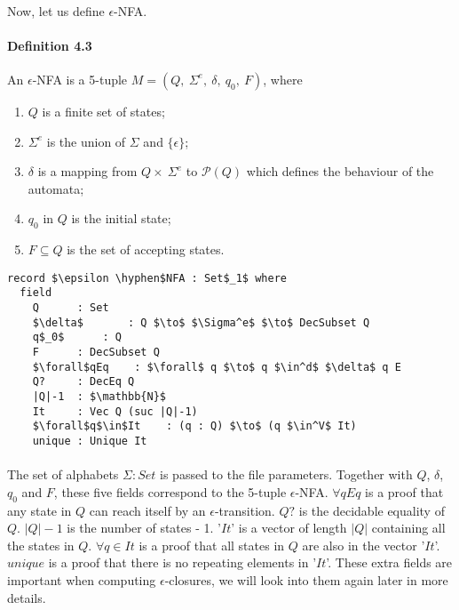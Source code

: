 \paragraph{} Now, let us define \(\epsilon\)-NFA. 

\paragraph{Definition 4.3} An \(\epsilon\)-NFA is a 5-tuple \(M = (Q
,\ \Sigma^e,\ \delta,\ q_0,\ F)\), where
\begin{enumerate}[nolistsep]
  \item \(Q\) is a finite set of states;
  \item \(\Sigma^e\) is the union of \(\Sigma\) and \(\{\epsilon\}\);
  \item \(\delta\) is a mapping from \(Q \times\ \Sigma^e\) to
    \(\mathcal P \left({Q}\right)\) which defines the behaviour of the automata;
  \item \(q_0\) in \(Q\) is the initial state;
  \item \(F \subseteq Q\) is the set of accepting states. 
\end{enumerate}
\vspace{0.7pc}
\begin{lstlisting}[caption=\(\epsilon\)-NFA,mathescape=true]
record $\epsilon \hyphen$NFA : Set$_1$ where
  field
    Q      : Set
    $\delta$       : Q $\to$ $\Sigma^e$ $\to$ DecSubset Q
    q$_0$      : Q
    F      : DecSubset Q
    $\forall$qEq    : $\forall$ q $\to$ q $\in^d$ $\delta$ q E
    Q?     : DecEq Q
    |Q|-1  : $\mathbb{N}$
    It     : Vec Q (suc |Q|-1)
    $\forall$q$\in$It    : (q : Q) $\to$ (q $\in^V$ It)
    unique : Unique It
\end{lstlisting}
\paragraph{} The set of alphabets \(\Sigma : Set\) is passed to the file
parameters. Together with \(Q\), \(\delta\),
\(q_0\) and \(F\), these five fields correspond to the 5-tuple
\(\epsilon\)-NFA. \(\forall qEq\) is a proof that any state in \(Q\)
can reach itself by an \(\epsilon\)-transition. \(Q?\) is
the decidable equality of \(Q\). \(|Q|-1\) is the number of states -
1. '\(It\)' is a vector of length \(|Q|\) containing all the
states in \(Q\). \(\forall q\in It\) is a
proof that all states in \(Q\) are also in the vector
'\(It\)'. \(unique\) is a proof that there is no repeating elements in
'\(It\)'. These extra fields are important when computing
\(\epsilon\)-closures, we will look into them again later in more
details.  

